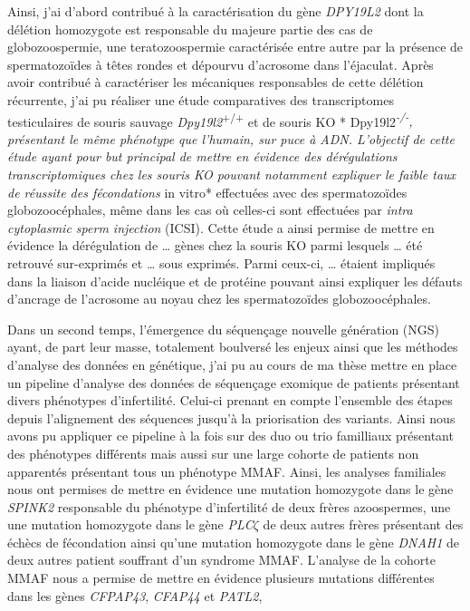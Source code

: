 \documentclass[12pt,twoside]{reedthesis}
\theoremstyle{definition}
\theoremstyle{definition}
\theoremstyle{remark}
\begin{document}
  Ainsi, j'ai d'abord contribué à la caractérisation du gène
  \emph{DPY19L2} dont la délétion homozygote est responsable du majeure
  partie des cas de globozoospermie, une teratozoospermie caractérisée
  entre autre par la présence de spermatozoïdes à têtes rondes et dépourvu
  d'acrosome dans l'éjaculat. Après avoir contribué à caractériser les
  mécaniques responsables de cette délétion récurrente, j'ai pu réaliser
  une étude comparatives des transcriptomes testiculaires de souris
  sauvage \emph{Dpy19l2}\textsuperscript{+/+} et de souris KO *
  Dpy19l2\emph{\textsuperscript{-/-}, présentant le même phénotype que
  l'humain, sur puce à ADN. L'objectif de cette étude ayant pour but
  principal de mettre en évidence des dérégulations transcriptomiques chez
  les souris KO pouvant notamment expliquer le faible taux de réussite des
  fécondations }in vitro* effectuées avec des spermatozoïdes
  globozoocéphales, même dans les cas où celles-ci sont effectuées par
  \emph{intra cytoplasmic sperm injection} (ICSI). Cette étude a ainsi
  permise de mettre en évidence la dérégulation de \ldots{} gènes chez la
  souris KO parmi lesquels \ldots{} été retrouvé sur-exprimés et \ldots{}
  sous exprimés. Parmi ceux-ci, \ldots{} étaient impliqués dans la liaison
  d'acide nucléique et de protéine pouvant ainsi expliquer les défauts
  d'ancrage de l'acrosome au noyau chez les spermatozoïdes
  globozoocéphales.
  
  Dans un second temps, l'émergence du séquençage nouvelle génération
  (NGS) ayant, de part leur masse, totalement boulversé les enjeux ainsi
  que les méthodes d'analyse des données en génétique, j'ai pu au cours de
  ma thèse mettre en place un pipeline d'analyse des données de séquençage
  exomique de patients présentant divers phénotypes d'infertilité.
  Celui-ci prenant en compte l'ensemble des étapes depuis l'alignement des
  séquences jusqu'à la priorisation des variants. Ainsi nous avons pu
  appliquer ce pipeline à la fois sur des duo ou trio familliaux
  présentant des phénotypes différents mais aussi sur une large cohorte de
  patients non apparentés présentant tous un phénotype MMAF. Ainsi, les
  analyses familiales nous ont permises de mettre en évidence une mutation
  homozygote dans le gène \emph{SPINK2} responsable du phénotype
  d'infertilité de deux frères azoospermes, une une mutation homozygote
  dans le gène \emph{PLC}\(\zeta\) de deux autres frères présentant des
  échècs de fécondation ainsi qu'une mutation homozygote dans le gène
  \emph{DNAH1} de deux autres patient souffrant d'un syndrome MMAF.
  L'analyse de la cohorte MMAF nous a permise de mettre en évidence
  plusieurs mutations différentes dans les gènes \emph{CFPAP43},
  \emph{CFAP44} et \emph{PATL2},
  
\end{document}
